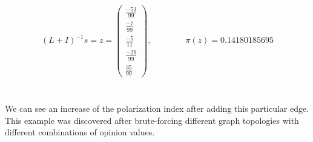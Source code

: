 \begin{equation}
	\begin{aligned}
		(L+I)^{-1}s=z=
		\left(\begin{matrix}
		\frac{-53}{99} \\
		\frac{-7}{99} \\
		\frac{-5}{11} \\
		\frac{-29}{99} \\
		\frac{35}{99}
		\end{matrix}\right),
		\qquad \qquad
		\pi(z) = 0.14180185695
	\end{aligned}
\end{equation}
\\
\\
We can see an increase of the polarization index after adding this particular edge. This example was discovered after brute-forcing different graph topologies with different combinations of opinion values.
\clearpage

